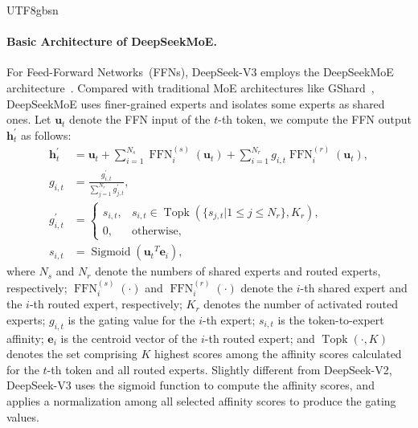 \documentclass[11pt, a4paper, logo, copyright, nonumbering]{deepseek}
\newcommand{\dsvii}{DeepSeek-V2}
\newcommand{\dsmoe}{DeepSeekMoE}
\newcommand{\dsviii}{DeepSeek-V3}
\renewcommand{\leq}{\leqslant}
\begin{document}
\begin{CJK*}{UTF8}{gbsn}
\paragraph{Basic Architecture of \dsmoe{}.}
For Feed-Forward Networks~(FFNs), \dsviii{} employs the \dsmoe{} architecture~\citep{deepseekmoe}. 
Compared with traditional MoE architectures like GShard~\citep{gshard}, \dsmoe{} uses finer-grained experts and isolates some experts as shared ones.
Let $\mathbf{u}_{t}$ denote the FFN input of the $t$-th token, we compute the FFN output $\mathbf{h}_{t}^{\prime}$ as follows:
\begin{align}
    \mathbf{h}_{t}^{\prime} & = \mathbf{u}_{t} + \sum_{i=1}^{N_{s}} {\operatorname{FFN}^{(s)}_{i}\left( \mathbf{u}_{t} \right)} + \sum_{i=1}^{N_r} {g_{i,t} \operatorname{FFN}^{(r)}_{i}\left( \mathbf{u}_{t} \right)}, \\
    g_{i,t} & = \frac{g^{\prime}_{i,t}}{\sum_{j=1}^{N_r} g^{\prime}_{j,t}}, \\
    g^{\prime}_{i,t} & = \begin{cases} 
    s_{i,t}, & s_{i,t} \in \operatorname{Topk} (\{ s_{j, t} | 1 \leq j \leq N_r \}, K_{r}), \\
    0, & \text{otherwise}, 
    \end{cases} \\
    s_{i,t} & = \operatorname{Sigmoid} \left( {\mathbf{u}_{t}}^{T} \mathbf{e}_{i} \right),
\end{align}
where $N_{s}$ and $N_r$ denote the numbers of shared experts and routed experts, respectively; 
$\operatorname{FFN}^{(s)}_{i}(\cdot)$ and $\operatorname{FFN}^{(r)}_{i}(\cdot)$ denote the $i$-th shared expert and the $i$-th routed expert, respectively; 
$K_{r}$ denotes the number of activated routed experts; 
$g_{i,t}$ is the gating value for the $i$-th expert; 
$s_{i,t}$ is the token-to-expert affinity; 
$\mathbf{e}_{i}$ is the centroid vector of the $i$-th routed expert; 
and $\operatorname{Topk}(\cdot, K)$ denotes the set comprising $K$ highest scores among the affinity scores calculated for the $t$-th token and all routed experts.
Slightly different from \dsvii{}, \dsviii{} uses the sigmoid function to compute the affinity scores, and applies a normalization among all selected affinity scores to produce the gating values. 


\end{CJK*}
\end{document}
